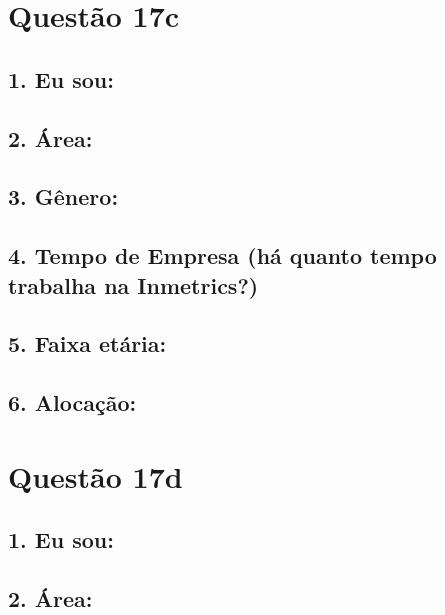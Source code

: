 \documentclass[]{book}
\begin{document}
\hypertarget{questao-17c}{%
\section{Questão 17c}\label{questao-17c}}

\hypertarget{eu-sou-37}{%
\subsection{1. Eu sou:}\label{eu-sou-37}}

\hypertarget{area-37}{%
\subsection{2. Área:}\label{area-37}}

\hypertarget{genero-37}{%
\subsection{3. Gênero:}\label{genero-37}}

\hypertarget{tempo-de-empresa-ha-quanto-tempo-trabalha-na-inmetrics-37}{%
\subsection{4. Tempo de Empresa (há quanto tempo trabalha na Inmetrics?)}\label{tempo-de-empresa-ha-quanto-tempo-trabalha-na-inmetrics-37}}

\hypertarget{faixa-etaria-37}{%
\subsection{5. Faixa etária:}\label{faixa-etaria-37}}

\hypertarget{alocacao-37}{%
\subsection{6. Alocação:}\label{alocacao-37}}

\hypertarget{questao-17d}{%
\section{Questão 17d}\label{questao-17d}}

\hypertarget{eu-sou-38}{%
\subsection{1. Eu sou:}\label{eu-sou-38}}

\hypertarget{area-38}{%
\subsection{2. Área:}\label{area-38}}
\end{document}
